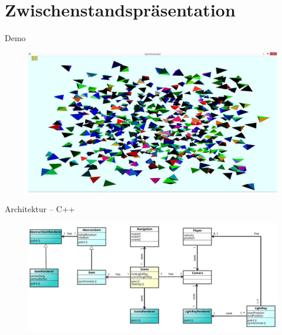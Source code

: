 

\subtitle{Game Programming}



\slidetitle
\section*{Zwischenstandspräsentation}

\begin{frame}{Demo}
	\begin{figure}
		\centering
		\includegraphics[width=\textwidth, height=0.7\textheight, keepaspectratio]{images/500_gems_intel}
	\end{figure}
\end{frame}


\begin{frame}{Architektur -- C++}
	\begin{figure}
		\centering
		\includegraphics[width=\textwidth, height=\textheight, keepaspectratio]{images/klassendiagramm}
	\end{figure}
\end{frame}


